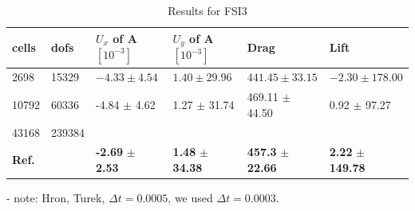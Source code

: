 \begin{table}[!h]
  \begin{center}
  \begin{tabular}{|l | l | l | l | l | l|} \hline
	cells & dofs & $U_x$ of A $[10^{-3}]$ & $U_y$ of A $[10^{-3}]$ & Drag & Lift\\ \hline
   2698 & 15329 & $ -4.33 \pm 4.54$ & $ 1.40 \pm 29.96$ & $441.45 \pm 33.15 $ & $-2.30 \pm 178.00$\\   \hline
   10792 & 60336 & -4.84 $\pm$ 4.62 &  1.27 $\pm$ 31.74 & 469.11 $\pm$ 44.50 & 0.92 $\pm$ 97.27\\ \hline
   43168 & 239384 & $ $&  $ $ & $ $ & $ $   \\ \hline \hline
    \textbf{Ref.}  & & \textbf{-2.69} $\pm$ \textbf{2.53} & \textbf{1.48} $\pm$ \textbf{34.38} & \textbf{457.3} $\pm$ \textbf{22.66} & \textbf{2.22} $\pm$ \textbf{149.78}\\ \hline 
    \hline

  \end{tabular}
	  \caption{Results for FSI3}
  \end{center}
\end{table}
- note: Hron, Turek, $\Delta t = 0.0005$, we used $\Delta t = 0.0003$. \\ \\

